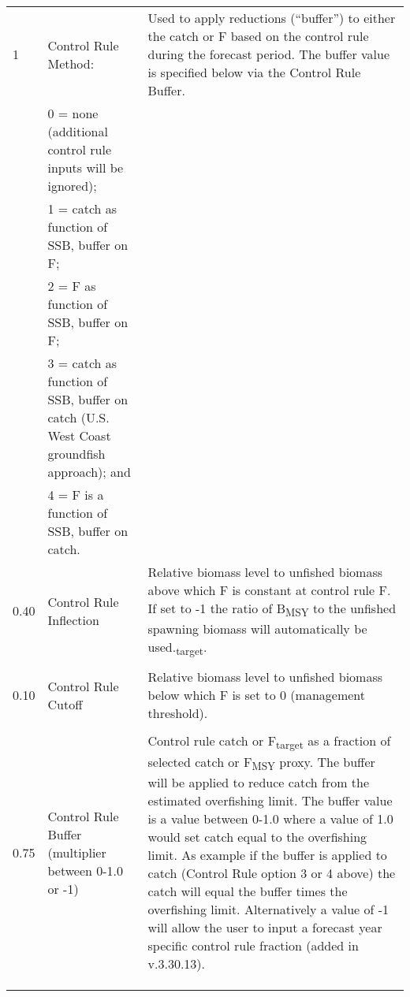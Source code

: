 \begin{landscape}
{\begin{longtable}{p{2cm} p{7cm} p{12cm}}
  \pagebreak
  1 & Control Rule Method: & \multirow{1}{1cm}[-0.15cm]{\parbox{12cm}{Used to apply reductions (``buffer'') to either the catch or F based on the control rule during the forecast period. The buffer value is specified below via the Control Rule Buffer.}} \Tstrut\\
    & 0 = none (additional control rule inputs will be ignored); & \\
    & 1 = catch as function of SSB, buffer on F; & \\
    & 2 = F as function of SSB, buffer on F; & \\
    & 3 = catch as function of SSB, buffer on catch (U.S. West Coast groundfish approach); and & \\
    & 4 = F is a function of SSB, buffer on catch. & \Bstrut\\
  \hline

  0.40 \Tstrut & Control Rule Inflection & \multirow{1}{1cm}[-0.2cm]{\parbox{12cm}{Relative biomass level to unfished biomass above which F is constant at control rule F. If set to -1 the ratio of B\textsubscript{MSY} to the unfished spawning biomass will automatically be used.\textsubscript{target}.}} \Bstrut\\
    & & \Tstrut\Bstrut\\

  \hline
  0.10 \Tstrut & Control Rule Cutoff & \multirow{1}{1cm}[-0.2cm]{\parbox{12cm}{Relative biomass level to unfished biomass below which F is set to 0 (management threshold).}} \\
    & & \\

  \hline
  0.75 \Tstrut & Control Rule Buffer (multiplier between 0-1.0 or -1) & \multirow{1}{1cm}[-0.25cm]{\parbox{12cm}{Control rule catch or F\textsubscript{target} as a fraction of selected catch or F\textsubscript{MSY} proxy. The buffer will be applied to reduce catch from the estimated overfishing limit. The buffer value is a value between 0-1.0 where a value of 1.0 would set catch equal to the overfishing limit. As example if the buffer is applied to catch (Control Rule option 3 or 4 above) the catch will equal the buffer times the overfishing limit. Alternatively a value of -1 will allow the user to input a forecast year specific control rule fraction (added in v.3.30.13).}} \Bstrut\\ 
    & & \Bstrut\\
    & & \Bstrut\\
    & & \Bstrut\\


\end{longtable}}
\end{landscape}
